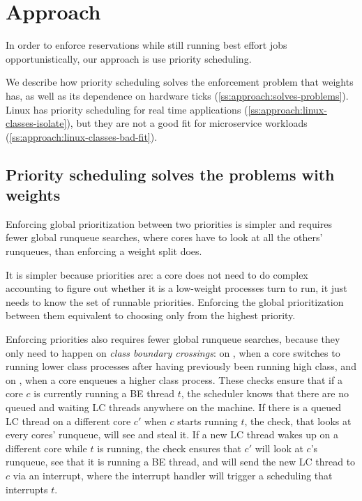 \section{Approach}\label{s:approach}

In order to enforce reservations while still running best effort jobs
opportunistically, our approach is use priority scheduling.

We describe how priority scheduling solves the enforcement problem that weights
has, as well as its dependence on hardware ticks
(\autoref{ss:approach:solves-problems}). Linux has priority scheduling for real
time applications (\autoref{ss:approach:linux-classes-isolate}), but they are
not a good fit for microservice workloads
(\autoref{ss:approach:linux-classes-bad-fit}).

\subsection{Priority scheduling solves the problems with
weights}\label{ss:approach:solves-problems}

Enforcing global prioritization between two priorities is simpler and requires
fewer global runqueue searches, where cores have to look at all the others'
runqueues, than enforcing a weight split does. 

It is simpler because priorities are: a core does not need to do complex
accounting to figure out whether it is a low-weight processes turn to run, it
just needs to know the set of runnable priorities. Enforcing the global
prioritization between them equivalent to choosing only from the highest
priority.

Enforcing priorities also requires fewer global runqueue searches, because they
only need to happen on \textit{class boundary crossings}: on \exit{}, when a
core switches to running lower class processes after having previously been
running high class, and on \entry{}, when a core enqueues a higher class
process. These checks ensure that if a core $c$ is currently running a BE thread
$t$, the scheduler knows that there are no queued and waiting LC threads
anywhere on the machine. If there is a queued LC thread on a different core $c'$
when $c$ starts running $t$, the \exit{} check, that looks at every cores'
runqueue, will see and steal it. If a new LC thread wakes up on a different core
while $t$ is running, the \entry{} check ensures that $c'$ will look at $c$'s
runqueue, see that it is running a BE thread, and will send the new LC thread to
$c$ via an interrupt, where the interrupt handler will trigger a scheduling that
interrupts $t$.

